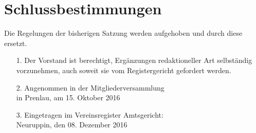 \documentclass{scrartcl}
\begin{document}
\pagebreak
\section*{Schlussbestimmungen}



Die Regelungen der bisherigen Satzung werden aufgehoben und durch diese ersetzt.



\begin{itemize}
	\item[1.] Der Vorstand ist berechtigt, Ergänzungen redaktioneller Art selbständig
			  vorzunehmen, auch soweit sie vom Registergericht gefordert werden.	
	\item[2.] Angenommen in der Mitgliederversammlung\\[0,5cm]
	          in Prenlau, am 15. Oktober 2016
	\item[3.] Eingetragen im Vereinsregister Amtsgericht:\\[0,5cm]
              Neuruppin, den 08. Dezember 2016
\end{itemize}
\end{document}
